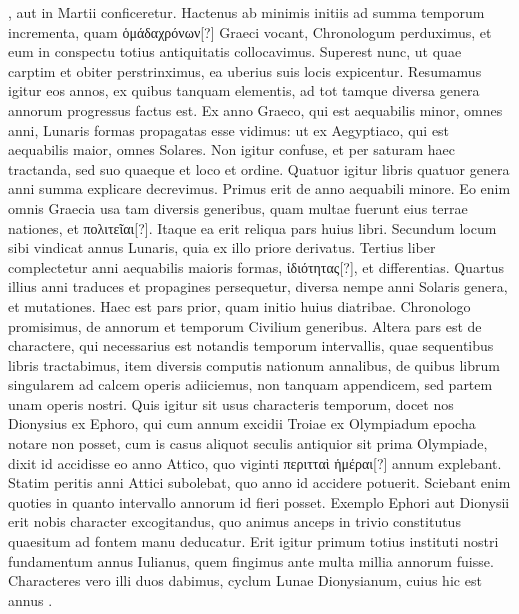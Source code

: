  , aut in 
Martii conficeretur.
Hactenus ab minimis initiis ad summa temporum
incrementa, quam \textgreek{ὁμάδαχρόνων[?]} Graeci vocant, Chronologum
perduximus, et eum in conspectu totius antiquitatis collocavimus.
Superest nunc, ut quae carptim et obiter perstrinximus, ea uberius
suis locis expicentur.
Resumamus igitur eos annos, ex quibus tanquam
elementis, ad tot tamque diversa genera annorum progressus
factus est.
Ex anno Graeco, qui est aequabilis minor, omnes anni, Lunaris
formas propagatas esse vidimus: ut ex Aegyptiaco, qui est aequabilis
maior, omnes Solares.
Non igitur confuse, et per saturam haec
tractanda, sed suo quaeque et loco et ordine.
Quatuor igitur libris
quatuor genera anni summa explicare decrevimus.
Primus erit de
anno aequabili minore.
Eo enim omnis Graecia usa tam diversis generibus,
quam multae fuerunt eius terrae nationes, et \textgreek{πολιτεῖαι[?]}.
Itaque
ea erit reliqua pars huius libri.
Secundum locum sibi vindicat annus
Lunaris, quia ex illo priore derivatus.
Tertius liber complectetur anni
aequabilis maioris formas, \textgreek{ἰδιότητας[?]}, et differentias.
Quartus illius anni
traduces et propagines persequetur, diversa nempe anni Solaris genera,
et mutationes.
Haec est pars prior, quam initio huius diatribae.
Chronologo promisimus, de annorum et temporum Civilium generibus.
Altera pars est de charactere, qui necessarius est notandis temporum
intervallis, quae sequentibus libris tractabimus, item diversis
computis nationum annalibus, de quibus librum singularem ad calcem
operis adiiciemus, non tanquam appendicem, sed partem unam
operis nostri.
%
Quis igitur sit usus characteris temporum, docet nos
Dionysius ex Ephoro, qui cum annum excidii Troiae ex Olympiadum
epocha notare non posset, cum is casus aliquot seculis antiquior
sit prima Olympiade, dixit id accidisse eo anno Attico, quo viginti
\textgreek{περιτταὶ ἡμέραι[?]} annum explebant.
Statim peritis anni Attici subolebat,
quo anno id accidere potuerit.
Sciebant enim quoties in quanto
intervallo annorum id fieri posset.
Exemplo Ephori aut Dionysii
erit nobis character excogitandus, quo animus anceps in trivio constitutus
quaesitum ad fontem manu deducatur.
Erit igitur primum
totius instituti nostri fundamentum annus Iulianus, quem fingimus
ante multa millia annorum fuisse.
Characteres vero illi duos dabimus,
cyclum Lunae Dionysianum, cuius hic est annus .
